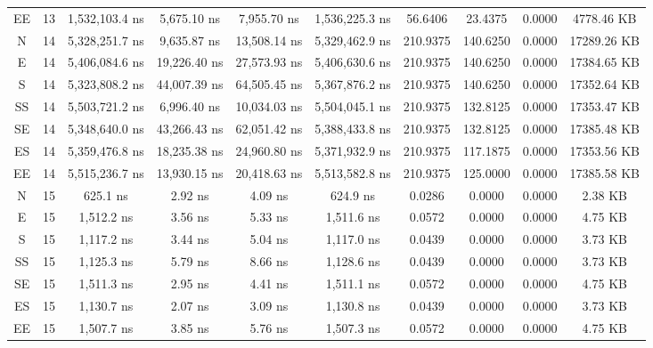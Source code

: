 \begin{sidewaystable}
\begin{tabular}{|c|c|c|c|c|c|c|c|c|c|}
        EE     & 13    & 1,532,103.4 ns & 5,675.10 ns  & 7,955.70 ns  & 1,536,225.3 ns & 56.6406  & 23.4375  & 0.0000 & 4778.46 KB  \\
        N      & 14    & 5,328,251.7 ns & 9,635.87 ns  & 13,508.14 ns & 5,329,462.9 ns & 210.9375 & 140.6250 & 0.0000 & 17289.26 KB \\
        E      & 14    & 5,406,084.6 ns & 19,226.40 ns & 27,573.93 ns & 5,406,630.6 ns & 210.9375 & 140.6250 & 0.0000 & 17384.65 KB \\
        S      & 14    & 5,323,808.2 ns & 44,007.39 ns & 64,505.45 ns & 5,367,876.2 ns & 210.9375 & 140.6250 & 0.0000 & 17352.64 KB \\
        SS     & 14    & 5,503,721.2 ns & 6,996.40 ns  & 10,034.03 ns & 5,504,045.1 ns & 210.9375 & 132.8125 & 0.0000 & 17353.47 KB \\
        SE     & 14    & 5,348,640.0 ns & 43,266.43 ns & 62,051.42 ns & 5,388,433.8 ns & 210.9375 & 132.8125 & 0.0000 & 17385.48 KB \\
        ES     & 14    & 5,359,476.8 ns & 18,235.38 ns & 24,960.80 ns & 5,371,932.9 ns & 210.9375 & 117.1875 & 0.0000 & 17353.56 KB \\
        EE     & 14    & 5,515,236.7 ns & 13,930.15 ns & 20,418.63 ns & 5,513,582.8 ns & 210.9375 & 125.0000 & 0.0000 & 17385.58 KB \\
        N      & 15    & 625.1 ns       & 2.92 ns      & 4.09 ns      & 624.9 ns       & 0.0286   & 0.0000   & 0.0000 & 2.38 KB     \\
        E      & 15    & 1,512.2 ns     & 3.56 ns      & 5.33 ns      & 1,511.6 ns     & 0.0572   & 0.0000   & 0.0000 & 4.75 KB     \\
        S      & 15    & 1,117.2 ns     & 3.44 ns      & 5.04 ns      & 1,117.0 ns     & 0.0439   & 0.0000   & 0.0000 & 3.73 KB     \\
        SS     & 15    & 1,125.3 ns     & 5.79 ns      & 8.66 ns      & 1,128.6 ns     & 0.0439   & 0.0000   & 0.0000 & 3.73 KB     \\
        SE     & 15    & 1,511.3 ns     & 2.95 ns      & 4.41 ns      & 1,511.1 ns     & 0.0572   & 0.0000   & 0.0000 & 4.75 KB     \\
        ES     & 15    & 1,130.7 ns     & 2.07 ns      & 3.09 ns      & 1,130.8 ns     & 0.0439   & 0.0000   & 0.0000 & 3.73 KB     \\
        EE     & 15    & 1,507.7 ns     & 3.85 ns      & 5.76 ns      & 1,507.3 ns     & 0.0572   & 0.0000   & 0.0000 & 4.75 KB     \\

\end{tabular}
\end{sidewaystable}
